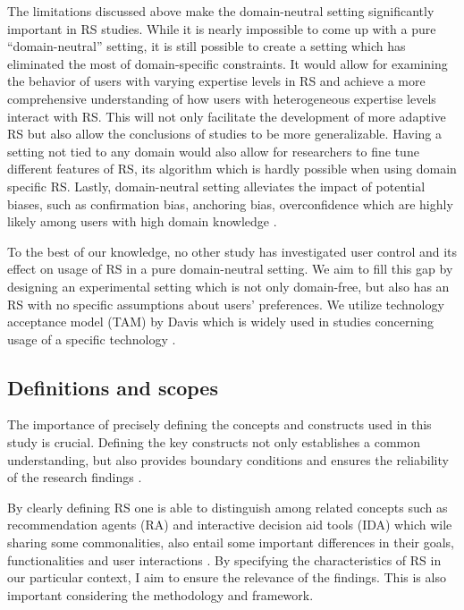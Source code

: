 \documentclass[a4paper,12pt]{article}
\begin{document}
The limitations discussed above make the domain-neutral setting significantly important in RS studies. While it is nearly impossible to come up with a pure ``domain-neutral'' setting, it is still possible to create a setting which has eliminated the most of domain-specific constraints. It would allow for examining the behavior of users with varying expertise levels in RS and achieve a more comprehensive understanding of how users with heterogeneous expertise levels interact with RS. This will not only facilitate the development of more adaptive RS but also allow the conclusions of studies to be more generalizable. Having a setting not tied to any domain would also allow for researchers to fine tune different features of RS, its algorithm which is hardly possible when using domain specific RS. Lastly, domain-neutral setting alleviates the impact of potential biases, such as confirmation bias, anchoring bias, overconfidence which are highly likely among users with high domain knowledge \citep{hijikata2012relation}.

To the best of our knowledge, no other study has investigated user control and its effect on usage of RS in a pure domain-neutral setting. We aim to fill this gap by designing an experimental setting which is not only domain-free, but also has an RS with no specific assumptions about users' preferences. We utilize technology acceptance model (TAM) by Davis which is widely used in studies concerning usage of a specific technology \citep{davis1985technology}.

\subsection{Definitions and scopes}

The importance of precisely defining the concepts and constructs used in this study is crucial. Defining the key constructs not only establishes a common understanding, but also provides boundary conditions and ensures the reliability of the research findings \citep{creswell2013research}.

By clearly defining RS one is able to distinguish among related concepts such as recommendation agents (RA) and interactive decision aid tools (IDA) which wile sharing some commonalities, also entail some important differences in their goals, functionalities and user interactions \citep{xiao2007commerce}. By specifying the characteristics of RS in our particular context, I aim to ensure the relevance of the findings. This is also important considering the methodology and framework.
\end{document}
